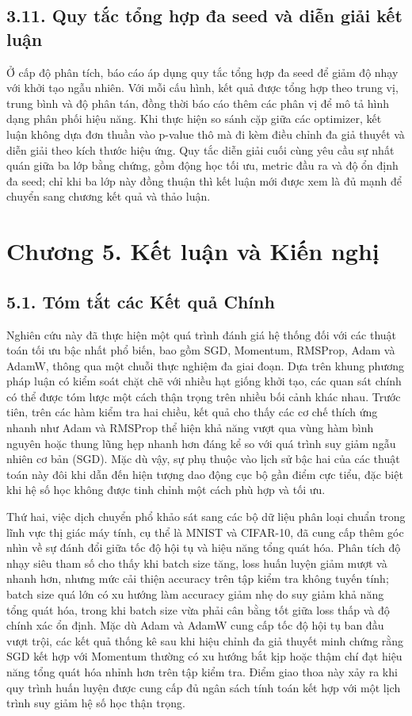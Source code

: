 \documentclass[a4paper,12pt]{article}
\begin{document}
\subsection{3.11. Quy tắc tổng hợp đa seed và diễn giải kết luận}

Ở cấp độ phân tích, báo cáo áp dụng quy tắc tổng hợp đa seed để giảm độ nhạy với khởi tạo ngẫu nhiên. Với mỗi cấu hình, kết quả được tổng hợp theo trung vị, trung bình và độ phân tán, đồng thời báo cáo thêm các phân vị để mô tả hình dạng phân phối hiệu năng. Khi thực hiện so sánh cặp giữa các optimizer, kết luận không dựa đơn thuần vào p-value thô mà đi kèm điều chỉnh đa giả thuyết và diễn giải theo kích thước hiệu ứng. Quy tắc diễn giải cuối cùng yêu cầu sự nhất quán giữa ba lớp bằng chứng, gồm động học tối ưu, metric đầu ra và độ ổn định đa seed; chỉ khi ba lớp này đồng thuận thì kết luận mới được xem là đủ mạnh để chuyển sang chương kết quả và thảo luận.
\section{Chương 5. Kết luận và Kiến nghị}

\subsection{5.1. Tóm tắt các Kết quả Chính}

Nghiên cứu này đã thực hiện một quá trình đánh giá hệ thống đối với các thuật toán tối ưu bậc nhất phổ biến, bao gồm SGD, Momentum, RMSProp, Adam và AdamW, thông qua một chuỗi thực nghiệm đa giai đoạn. Dựa trên khung phương pháp luận có kiểm soát chặt chẽ với nhiều hạt giống khởi tạo, các quan sát chính có thể được tóm lược một cách thận trọng trên nhiều bối cảnh khác nhau. Trước tiên, trên các hàm kiểm tra hai chiều, kết quả cho thấy các cơ chế thích ứng nhanh như Adam và RMSProp thể hiện khả năng vượt qua vùng hàm bình nguyên hoặc thung lũng hẹp nhanh hơn đáng kể so với quá trình suy giảm ngẫu nhiên cơ bản (SGD). Mặc dù vậy, sự phụ thuộc vào lịch sử bậc hai của các thuật toán này đôi khi dẫn đến hiện tượng dao động cục bộ gần điểm cực tiểu, đặc biệt khi hệ số học không được tinh chỉnh một cách phù hợp và tối ưu.

Thứ hai, việc dịch chuyển phổ khảo sát sang các bộ dữ liệu phân loại chuẩn trong lĩnh vực thị giác máy tính, cụ thể là MNIST và CIFAR-10, đã cung cấp thêm góc nhìn về sự đánh đổi giữa tốc độ hội tụ và hiệu năng tổng quát hóa. Phân tích độ nhạy siêu tham số cho thấy khi batch size tăng, loss huấn luyện giảm mượt và nhanh hơn, nhưng mức cải thiện accuracy trên tập kiểm tra không tuyến tính; batch size quá lớn có xu hướng làm accuracy giảm nhẹ do suy giảm khả năng tổng quát hóa, trong khi batch size vừa phải cân bằng tốt giữa loss thấp và độ chính xác ổn định. Mặc dù Adam và AdamW cung cấp tốc độ hội tụ ban đầu vượt trội, các kết quả thống kê sau khi hiệu chỉnh đa giả thuyết minh chứng rằng SGD kết hợp với Momentum thường có xu hướng bắt kịp hoặc thậm chí đạt hiệu năng tổng quát hóa nhỉnh hơn trên tập kiểm tra. Điểm giao thoa này xảy ra khi quy trình huấn luyện được cung cấp đủ ngân sách tính toán kết hợp với một lịch trình suy giảm hệ số học thận trọng.
\end{document}
